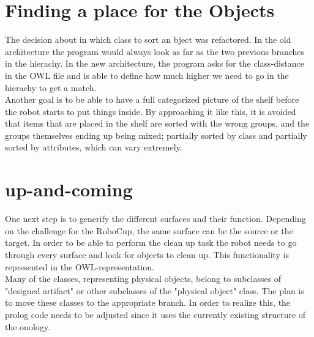 \documentclass[main.tex]{subfiles}
\begin{document}
		\section{Finding a place for the Objects}
		The decision about in which class to sort an bject was refactored. In the old architecture the program would always look as far as the two previous branches in the hierachy. In the new architecture, the program asks for the class-distance in the OWL file and is able to define how much higher we need to go in the hierachy to get a match.\\
Another goal is to be able to have a full categorized picture of the shelf before the robot starts to put things inside. By approaching it like this, it is avoided that items that are placed in the shelf are sorted with the wrong groups, and the groups themselves ending up being mixed; partially sorted by class and partially sorted by attributes, which can vary extremely.
 

		\section{up-and-coming}
		One next step is to generify the different surfaces and their function. Depending on the challenge for the RoboCup, the same surface can be the source or the target. In order to be able to perform the clean up task the robot needs to go through every surface and look for objects to clean up. This functionality is represented in the OWL-representation.\\
Many of the classes, representing physical objects, belong to subclasses of "designed artifact" or other subclasses of the "physical object" class. The plan is to move these classes to the appropriate branch. In order to realize this, the prolog code needs to be adjusted since it uses the currently existing structure of the onology.
\end{document}
